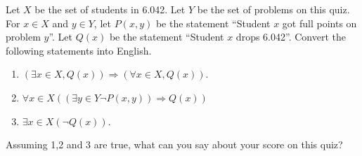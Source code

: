 \documentclass[12pt,oneside]{article}
\begin{document}
\begin{problem}{12}
Let $X$ be the set of students in 6.042. Let $Y$ be the set of problems on this quiz. For $x \in X$ and $y \in Y$, let $P(x,y)$ be the statement ``Student $x$ got full points on problem $y$''. Let $Q(x)$ be the statement ``Student $x$ drops 6.042''.
\bparts
{}
Convert the following statements into English.
\begin{enumerate}
\item $(\exists x\in X, Q(x) ) \Rightarrow (\forall x\in X, Q(x))$.

\item $\forall x\in X ((\exists y\in Y \neg P(x,y)) \Rightarrow  Q(x))$

\item $\exists x\in X (\neg Q(x))$.

\end{enumerate}
Assuming 1,2 and 3 are true, what can you say about your score on this quiz?


\eparts

\end{problem}



\newpage
\end{document}
